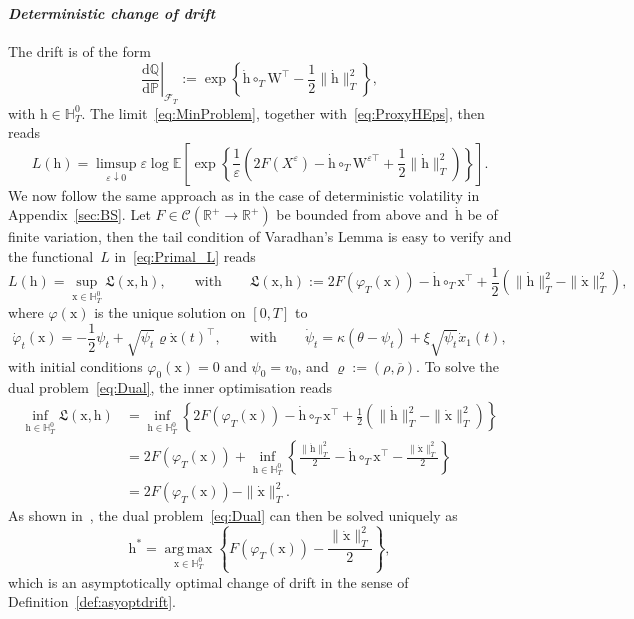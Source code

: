 \documentclass{amsart}[11pt]
\numberwithin{equation}{section}
\numberwithin{theorem}{subsection}
\numberwithin{proposition}{subsection}
\numberwithin{definition}{subsection}
\numberwithin{lemma}{subsection}
\numberwithin{assumption}{subsection}
\newcommand{\Cc}{\mathcal{C}}
\newcommand{\Ff}{\mathcal{F}}
\newcommand{\HH}{\mathbb{H}}
\newcommand{\PP}{\mathbb{P}}
\newcommand{\QQ}{\mathbb{Q}}
\newcommand{\RR}{\mathbb{R}}
\newcommand{\Lf}{\mathfrak{L}}
\newcommand{\EE}{\mathbb{E}}
\newcommand{\cT}{\circ_{T}}
\newcommand{\Wf}{\boldsymbol{\mathrm{W}}}
\newcommand{\vrho}{\boldsymbol{\mathrm{\varrho}}}
\newcommand{\brho}{\overline{\rho}}
\newcommand{\D}{\mathrm{d}}
\newcommand{\eps}{\varepsilon}
\newcommand{\hh}{\boldsymbol{\mathrm{h}}}
\newcommand{\xx}{\boldsymbol{\mathrm{x}}}
\newcommand{\half}{\frac{1}{2}}
\DeclareMathOperator*{\argmax}{arg\,max}
\begin{document}
\paragraph{\textit{Deterministic change of drift}}
The drift is of the form
$$ 
\left.\frac{\D\QQ}{\D\PP}\right|_{\Ff_T} := \exp\left\{\dot{\hh}\cT \Wf^\top - \frac{1}{2}\|\dot{\hh}\|_{T}^2\right\},
$$
with $\hh\in \HH_T^0$.
The limit~\eqref{eq:MinProblem}, together with~\eqref{eq:ProxyHEps}, then reads
$$
L(\hh) = \limsup_{\eps\downarrow 0}
\eps\log\EE\left[
\exp\left\{\frac{1}{\eps}\left(2F(X^{\eps}) - \dot{\hh}\cT \Wf^{\eps\top} + \frac{1}{2}\|\dot{\hh}\|_{T}^2\right)\right\}
\right] .
$$
We now follow the same approach as in the case of deterministic volatility in Appendix~\ref{sec:BS}. 
Let $F\in\Cc(\RR^+\rightarrow\RR^+)$ be bounded from above and~$\dot{\hh}$ be of finite variation, then the tail condition of Varadhan's Lemma is easy to verify and 
the functional~$L$ in~\eqref{eq:Primal_L} reads
$$
L(\hh) = \sup\limits_{\xx\in \HH_T^0}
\Lf(\xx,\hh),
\qquad\text{with}\qquad
\Lf(\xx,\hh) := 2 F(\varphi_T(\xx)) - \dot{\hh}\cT \xx^\top
 + \half\left(\|\dot{\hh}\|_{T}^2 - \|\dot{\xx}\|_{T}^2\right),
 $$
where $\varphi(\xx)$ is the unique solution on $[0,T]$ to
$$
\dot{\varphi}_t(\xx) = -\frac{1}{2}\psi_t + \sqrt{\psi_t}\vrho\dot{\xx}(t)^\top,
\qquad\text{with}\qquad
\dot{\psi}_t = \kappa (\theta - \psi_t) + \xi \sqrt{\psi_t} \dot{x}_1(t),
$$
with initial conditions $\varphi_0(\xx) = 0$ and $\psi_0 = v_0$, and $\vrho:=(\rho, \brho)$. 
To solve the dual problem~\eqref{eq:Dual}, the inner optimisation reads
\begin{align*}
\inf_{\hh\in\HH_T^0}\Lf(\xx,\hh) &= \inf_{\hh\in\HH_T^0} \left\{2F(\varphi_T(\xx)) - \dot{\hh}\cT \xx^\top
 + \half\left(\|\dot{\hh}\|_{T}^2 - \|\dot{\xx}\|_{T}^2\right)\right\} \\
&= 2F(\varphi_T(\xx)) + \inf_{\hh\in\HH_T^0}\left\{\frac{\|\dot{\hh}\|_{T}^2}{2} -\dot{\hh}\cT \xx^\top - \frac{\|\dot{\xx}\|_{T}^2}{2}\right\} \\
&= 2F(\varphi_T(\xx)) - \|\dot{\xx}\|_{T}^2.
\end{align*}
As shown in~\cite{Robertson2010}, the dual problem~\eqref{eq:Dual}
can then be solved uniquely as 
\begin{equation}\label{eq:detoptdrift_dual}
\hh^* = \argmax\limits_{\xx\in \HH_T^0} 
\left\{F(\varphi_T(\xx)) - \frac{\|\dot{\xx}\|_{T}^2}{2}\right\},
\end{equation}
which is an asymptotically optimal change of drift in the sense of Definition~\ref{def:asyoptdrift}.
\end{document}
